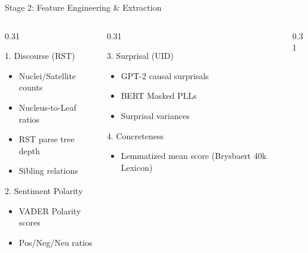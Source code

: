 \documentclass[aspectratio=169]{beamer}
\begin{document}
\begin{frame}{Stage 2: Feature Engineering \& Extraction}
    \small
    \begin{columns}[t]
        \begin{column}{0.31\textwidth}
            \begin{block}{1. Discourse (RST)}
                \begin{itemize}
                    \item Nuclei/Satellite counts
                    \item Nucleus-to-Leaf ratios
                    \item RST parse tree depth
                    \item Sibling relations
                \end{itemize}
            \end{block}
            \begin{block}{2. Sentiment Polarity}
                \begin{itemize}
                    \item VADER Polarity scores
                    \item Pos/Neg/Neu ratios
                \end{itemize}
            \end{block}
        \end{column}
        \begin{column}{0.31\textwidth}
            \begin{block}{3. Surprisal (UID)}
                \begin{itemize}
                    \item GPT-2 causal surprisals
                    \item BERT Masked PLLs
                    \item Surprisal variances
                \end{itemize}
            \end{block}
            \begin{block}{4. Concreteness}
                \begin{itemize}
                    \item Lemmatized mean score (Brysbaert 40k Lexicon)
                \end{itemize}
            \end{block}
        \end{column}
        \begin{column}{0.31\textwidth}

\end{column}
\end{columns}
\end{frame}
\end{document}
